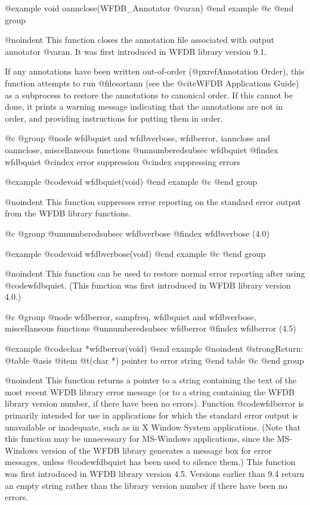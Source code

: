 {{{{{{{{{@example
void oannclose(WFDB_Annotator @var{an})
@end example
@c @end group

@noindent
This function closes the annotation file associated with output
annotator @var{an}.  It was first introduced in WFDB library version 9.1.

If any annotations have been written out-of-order (@pxref{Annotation Order}),
this function attempts to run @file{sortann} (see the @cite{WFDB
Applications Guide}) as a subprocess to restore the annotations to canonical
order.  If this cannot be done, it prints a warning message indicating that the
annotations are not in order, and providing instructions for putting them in
order.

@c @group
@node     wfdbquiet and wfdbverbose, wfdberror, iannclose and oannclose, miscellaneous functions
@unnumberedsubsec wfdbquiet
@findex wfdbquiet
@cindex error suppression
@cindex suppressing errors

@example
@code{void wfdbquiet(void)}
@end example
@c @end group

@noindent
This function suppresses error reporting on the standard error output
from the WFDB library functions.

@c @group
@unnumberedsubsec wfdbverbose
@findex wfdbverbose (4.0)

@example
@code{void wfdbverbose(void)}
@end example
@c @end group

@noindent
This function can be used to restore normal error reporting after using
@code{wfdbquiet}.  (This function was first introduced in WFDB library
version 4.0.)

@c @group
@node     wfdberror, sampfreq, wfdbquiet and wfdbverbose, miscellaneous functions
@unnumberedsubsec wfdberror
@findex wfdberror (4.5)

@example
@code{char *wfdberror(void)}
@end example
@noindent
@strong{Return:}
@table @asis
@item @t{(char *)}
pointer to error string
@end table
@c @end group

@noindent
This function returns a pointer to a string containing the text of the
most recent WFDB library error message (or to a string containing the WFDB
library version number, if there have been no errors).  Function
@code{wfdberror} is primarily intended for use in applications for which the
standard error output is unavailable or inadequate, such as in X Window
System applications.  (Note that this function may be unnecessary for
MS-Windows applications, since the MS-Windows version of the WFDB library
generates a message box for error messages, unless @code{wfdbquiet} has
been used to silence them.)  This function was first introduced in WFDB
library version 4.5.  Versions earlier than 9.4 return an empty string
rather than the library version number if there have been no errors.

}}}}}}}}}
